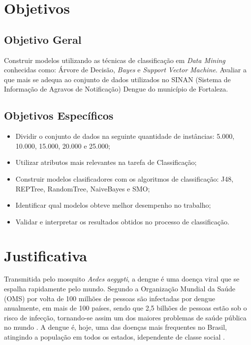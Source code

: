 \documentclass[
	12pt,				%
	openright,			%
	oneside,	
	a4paper,				%
	english,				%
	brazil				%
]{abntex2/abntex2} %
\begin{document}
	\section{Objetivos}
	
		\subsection{Objetivo Geral}

		Construir modelos utilizando as técnicas de classificação em \textit{Data Mining} conhecidas como: Árvore de Decisão, \textit{Bayes} e \textit{Support Vector Machine}. Avaliar a que mais se adequa ao conjunto de dados utilizados no SINAN (Sistema de Informação de Agravos de Notificação) Dengue do município de Fortaleza. 
		
		\subsection{Objetivos Específicos}
		
		\begin{itemize}
			\item Dividir o conjunto de dados na seguinte quantidade de instâncias: 5.000, 10.000, 15.000, 20.000 e 25.000;
			
			\item Utilizar atributos mais relevantes na tarefa de Classificação;
			
			\item Construir modelos clasificadores com os algoritmos de classificação: J48, REPTree, RandomTree, NaiveBayes e SMO;

			\item Identificar qual modelos obteve melhor desempenho no trabalho;
			
			\item Validar e interpretar os resultados obtidos no processo de classificação.
		\end{itemize}
		
	\section{Justificativa}
	

	Transmitida pelo mosquito \textit{Aedes aegypti}, a dengue é uma doença viral que se espalha rapidamente pelo mundo. Segundo a Organização Mundial da Saúde (OMS) por volta de 100 milhões de pessoas são infectadas por dengue anualmente, em mais de 100 países, sendo que 2,5 bilhões de pessoas estão sob o risco de infecção, tornando-se assim um dos maiores problemas de saúde pública no mundo \cite{bhatt:2013}. A dengue é, hoje, uma das doenças mais frequentes no Brasil, atingindo a população em todos os estados, idependente de classe social \cite{saude:2008}.
	
\end{document}
